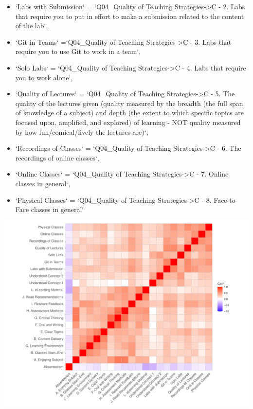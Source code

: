 \documentclass[
]{article}
\begin{document}
\begin{itemize}
\item
  `Labs with Submission` = `Q04\_Quality of Teaching
  Strategies-\textgreater C - 2. Labs that require you to put in effort
  to make a submission related to the content of the lab`,
\item
  `Git in Teams` =`Q04\_Quality of Teaching Strategies-\textgreater C -
  3. Labs that require you to use Git to work in a team`,
\item
  `Solo Labs` = `Q04\_Quality of Teaching Strategies-\textgreater C - 4.
  Labs that require you to work alone`,
\item
  `Quality of Lectures` = `Q04\_Quality of Teaching
  Strategies-\textgreater C - 5. The quality of the lectures given
  (quality measured by the breadth (the full span of knowledge of a
  subject) and depth (the extent to which specific topics are focused
  upon, amplified, and explored) of learning - NOT quality measured by
  how fun/comical/lively the lectures are)`,
\item
  `Recordings of Classes` = `Q04\_Quality of Teaching
  Strategies-\textgreater C - 6. The recordings of online classes`,
\item
  `Online Classes` = `Q04\_Quality of Teaching Strategies-\textgreater C
  - 7. Online classes in general`,
\item
  `Physical Classes` = `Q04\_Quality of Teaching
  Strategies-\textgreater C - 8. Face-to-Face classes in general`
\end{itemize}

\includegraphics{AnalysisOfCourseEvaluation-Notebook_files/figure-latex/CorrelationMatrixWithoutFigures-1.pdf}
\end{document}
